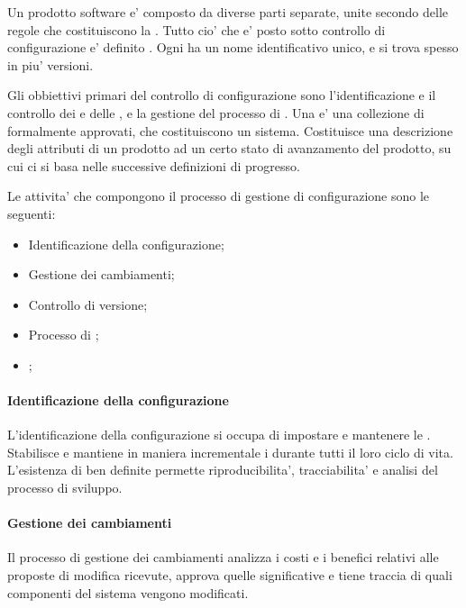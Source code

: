 Un prodotto software e' composto da diverse parti separate, unite secondo delle
regole che costituiscono la . Tutto cio' che e' posto
sotto controllo di configurazione e' definito . Ogni  ha un nome identificativo unico, e si
trova spesso in piu' versioni.


Gli obbiettivi primari del controllo di configurazione sono l'identificazione e
il controllo dei  e delle , e la
gestione del processo di . Una  e' una
collezione di  formalmente approvati, che
costituiscono un sistema. Costituisce una descrizione degli attributi di un
prodotto ad un certo stato di avanzamento del prodotto, su cui ci si basa nelle
successive definizioni di progresso.

Le attivita' che compongono il processo di gestione di configurazione sono le
seguenti:

\begin{itemize}
	\item Identificazione della configurazione;
	\item Gestione dei cambiamenti;
	\item Controllo di versione;
	\item Processo di ;
	\item {};
\end{itemize}

\paragraph{Identificazione della configurazione}

L'identificazione della configurazione si occupa di impostare e mantenere le
. Stabilisce e mantiene in maniera incrementale i
 durante tutti il loro ciclo di vita. L'esistenza
di  ben definite permette riproducibilita', tracciabilita' e
analisi del processo di sviluppo.

\paragraph{Gestione dei cambiamenti}

Il processo di gestione dei cambiamenti analizza i costi e i benefici relativi
alle proposte di modifica ricevute, approva quelle significative e tiene traccia
di quali componenti del sistema vengono modificati.

